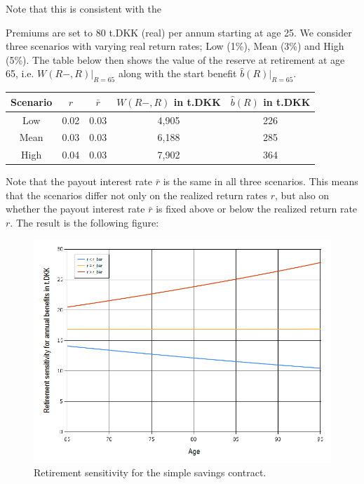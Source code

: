 \documentclass{book}
\newcommand{\1}[1]{\mathbbm{1}_{\left\lbrace #1 \right\rbrace}}
\theoremstyle{break}
\theoremstyle{remark}
\numberwithin{equation}{section}
\begin{document}
Note that this is consistent with the 

\begin{example}
Premiums are set to 80 t.DKK (real) per annum starting at age 25. We consider three scenarios with varying real return rates; Low (1\%), Mean (3\%) and High (5\%). The table below then shows the value of the reserve at retirement at age 65, i.e. $W(R-,R)|_{R=65}$ along with the start benefit $\hat{b}(R)|_{R=65}$.

\begin{center}
	\begin{tabular}{ |c|c|c|c|c| }
		\hline
		Scenario & $r$ & $\bar{r}$ & $W(R-,R)$ in t.DKK & $\hat{b}(R)$ in t.DKK \\
		\hline
		Low & 0.02 & 0.03 & 4,905 & 226 \\
		Mean & 0.03 & 0.03 & 6,188 & 285 \\
		High & 0.04 & 0.03 & 7,902 & 364 \\
		\hline
	\end{tabular}
\end{center}

Note that the payout interest rate $\bar{r}$ is the same in all three scenarios. This means that the scenarios differ not only on the realized return rates $r$, but also on whether the payout interest rate $\bar{r}$ is fixed above or below the realized return rate $r$. The result is the following figure:

\begin{figure}[H] \label{RSensiGraph}
	\centering
	\caption{Retirement sensitivity for the simple savings contract.}
	\includegraphics[width=\textwidth]{Rsensi}		
\end{figure}


\end{example}
\end{document}
